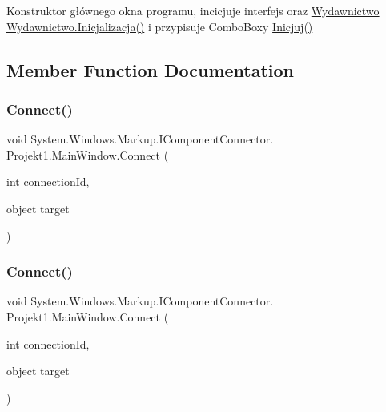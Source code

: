 Konstruktor głównego okna programu, incicjuje interfejs oraz \mbox{\hyperlink{class_projekt1_1_1_wydawnictwo}{Wydawnictwo}} \mbox{\hyperlink{class_projekt1_1_1_wydawnictwo_a5831651945cb56c52d8619a3167693ce}{Wydawnictwo.\+Inicjalizacja()}} i przypisuje Combo\+Boxy \mbox{\hyperlink{class_projekt1_1_1_main_window_afdda85a4d4f8eaa2014fdf0bc313af58}{Inicjuj()}} 



\subsection{Member Function Documentation}
\mbox{\label{class_projekt1_1_1_main_window_ae7ef4e7422455818e8e3deda6cc75900}} 
\subsubsection{\texorpdfstring{Connect()}{Connect()}\hspace{0.1cm}{\footnotesize\ttfamily [1/3]}}
{\footnotesize\ttfamily void System.\+Windows.\+Markup.\+I\+Component\+Connector. Projekt1.\+Main\+Window.\+Connect (\begin{DoxyParamCaption}\item[{int}]{connection\+Id,  }\item[{object}]{target }\end{DoxyParamCaption})\hspace{0.3cm}{\ttfamily [private]}}

\mbox{\label{class_projekt1_1_1_main_window_ae7ef4e7422455818e8e3deda6cc75900}} 
\subsubsection{\texorpdfstring{Connect()}{Connect()}\hspace{0.1cm}{\footnotesize\ttfamily [2/3]}}
{\footnotesize\ttfamily void System.\+Windows.\+Markup.\+I\+Component\+Connector. Projekt1.\+Main\+Window.\+Connect (\begin{DoxyParamCaption}\item[{int}]{connection\+Id,  }\item[{object}]{target }\end{DoxyParamCaption})\hspace{0.3cm}{\ttfamily [private]}}

